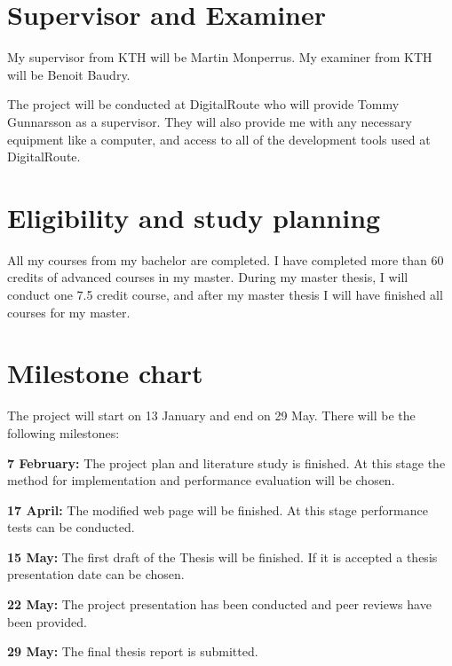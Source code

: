 \documentclass{article}
\begin{document}
\section{Supervisor and Examiner}

My supervisor from KTH will be Martin Monperrus. My examiner from KTH will be Benoit Baudry.

The project will be conducted at DigitalRoute who will provide Tommy Gunnarsson as a supervisor. They will also provide me with any necessary equipment like a computer, and access to all of the development tools used at DigitalRoute.

\section{Eligibility and study planning}

All my courses from my bachelor are completed. I have completed more than 60 credits of advanced courses in my master. During my master thesis, I will conduct one 7.5 credit course, and after my master thesis I will have finished all courses for my master.

\section{Milestone chart}

The project will start on 13 January and end on 29 May. There will be the following milestones:

\textbf{7 February:} The project plan and literature study is finished. At this stage the method for implementation and performance evaluation will be chosen.

\textbf{17 April:} The modified web page will be finished. At this stage performance tests can be conducted.

\textbf{15 May:} The first draft of the Thesis will be finished. If it is accepted a thesis presentation date can be chosen.

\textbf{22 May:} The project presentation has been conducted and peer reviews have been provided.

\textbf{29 May:} The final thesis report is submitted.

\printbibliography
\end{document}
